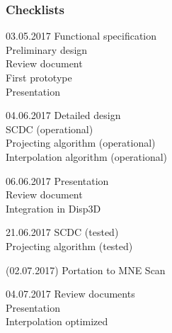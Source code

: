 \subsubsection{Checklists}
\begin{aims}
	\item[03.05.2017] Functional specification\\ Preliminary design\\Review document\\ First prototype\\Presentation
	\item[04.06.2017] Detailed design\\SCDC (operational)\\Projecting algorithm (operational)\\Interpolation algorithm (operational)
	\item[06.06.2017]Presentation\\Review document\\Integration in Disp3D
	\item[21.06.2017] SCDC (tested)\\Projecting algorithm (tested)
	\item[(02.07.2017)] Portation to MNE Scan
	\item[04.07.2017] Review documents\\Presentation\\Interpolation optimized


\end{aims}
